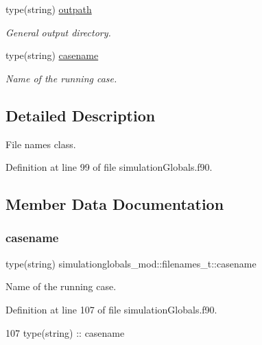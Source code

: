 \begin{DoxyCompactItemize}
type(string) \mbox{\hyperlink{structsimulationglobals__mod_1_1filenames__t_aa8af9fb10dcd5d2f5dfc0fe299a16755}{outpath}}
\begin{DoxyCompactList}\small\item\em General output directory. \end{DoxyCompactList}\item 
type(string) \mbox{\hyperlink{structsimulationglobals__mod_1_1filenames__t_a5a53822ea60d4941a19739cacb957469}{casename}}
\begin{DoxyCompactList}\small\item\em Name of the running case. \end{DoxyCompactList}\end{DoxyCompactItemize}


\subsection{Detailed Description}
File names class. 

Definition at line 99 of file simulation\+Globals.\+f90.



\subsection{Member Data Documentation}
\mbox{\label{structsimulationglobals__mod_1_1filenames__t_a5a53822ea60d4941a19739cacb957469}} 
\subsubsection{\texorpdfstring{casename}{casename}}
{\footnotesize\ttfamily type(string) simulationglobals\+\_\+mod\+::filenames\+\_\+t\+::casename\hspace{0.3cm}{\ttfamily [private]}}



Name of the running case. 



Definition at line 107 of file simulation\+Globals.\+f90.


\begin{DoxyCode}
107         \textcolor{keywordtype}{type}(string) :: casename
\end{DoxyCode}
\mbox{\label{structsimulationglobals__mod_1_1filenames__t_a28b7d9c5da2394c7a3ec6252bd95d9e4}} 
